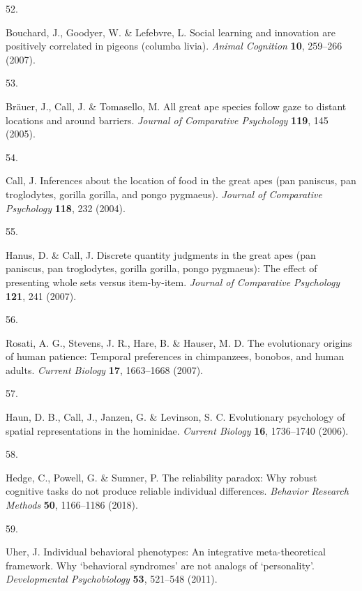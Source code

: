 \documentclass[
  man,floatsintext]{apa6}
\newlength{\cslhangindent}
\newlength{\csllabelwidth}
\newlength{\cslentryspacingunit} %
\newenvironment{CSLReferences}[2] %
 {%
  \setlength{\parindent}{0pt}
  \ifodd #1
  \let\oldpar\par
  \def\par{\hangindent=\cslhangindent\oldpar}
  \fi
  \setlength{\parskip}{#2\cslentryspacingunit}
 }%
 {}
\newcommand{\CSLLeftMargin}[1]{\parbox[t]{\csllabelwidth}{#1}}
\newcommand{\CSLRightInline}[1]{\parbox[t]{\linewidth - \csllabelwidth}{#1}\break}
\begin{document}
\begin{CSLReferences}{0}{0}
\leavevmode{}%
\CSLLeftMargin{52. }%
\CSLRightInline{Bouchard, J., Goodyer, W. \& Lefebvre, L. Social learning and innovation are positively correlated in pigeons (columba livia). \emph{Animal Cognition} \textbf{10}, 259--266 (2007).}

\leavevmode{}%
\CSLLeftMargin{53. }%
\CSLRightInline{Bräuer, J., Call, J. \& Tomasello, M. All great ape species follow gaze to distant locations and around barriers. \emph{Journal of Comparative Psychology} \textbf{119}, 145 (2005).}

\leavevmode{}%
\CSLLeftMargin{54. }%
\CSLRightInline{Call, J. Inferences about the location of food in the great apes (pan paniscus, pan troglodytes, gorilla gorilla, and pongo pygmaeus). \emph{Journal of Comparative Psychology} \textbf{118}, 232 (2004).}

\leavevmode{}%
\CSLLeftMargin{55. }%
\CSLRightInline{Hanus, D. \& Call, J. Discrete quantity judgments in the great apes (pan paniscus, pan troglodytes, gorilla gorilla, pongo pygmaeus): The effect of presenting whole sets versus item-by-item. \emph{Journal of Comparative Psychology} \textbf{121}, 241 (2007).}

\leavevmode{}%
\CSLLeftMargin{56. }%
\CSLRightInline{Rosati, A. G., Stevens, J. R., Hare, B. \& Hauser, M. D. The evolutionary origins of human patience: Temporal preferences in chimpanzees, bonobos, and human adults. \emph{Current Biology} \textbf{17}, 1663--1668 (2007).}

\leavevmode{}%
\CSLLeftMargin{57. }%
\CSLRightInline{Haun, D. B., Call, J., Janzen, G. \& Levinson, S. C. Evolutionary psychology of spatial representations in the hominidae. \emph{Current Biology} \textbf{16}, 1736--1740 (2006).}

\leavevmode{}%
\CSLLeftMargin{58. }%
\CSLRightInline{Hedge, C., Powell, G. \& Sumner, P. The reliability paradox: Why robust cognitive tasks do not produce reliable individual differences. \emph{Behavior Research Methods} \textbf{50}, 1166--1186 (2018).}

\leavevmode{}%
\CSLLeftMargin{59. }%
\CSLRightInline{Uher, J. Individual behavioral phenotypes: An integrative meta-theoretical framework. Why {`behavioral syndromes'} are not analogs of {`personality'}. \emph{Developmental Psychobiology} \textbf{53}, 521--548 (2011).}


\end{CSLReferences}
\end{document}
